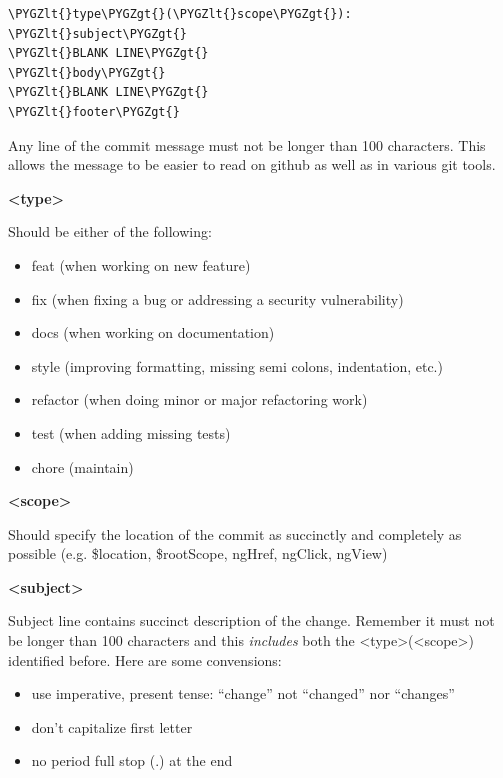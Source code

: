 \documentclass[letterpaper,10pt,english]{sphinxmanual}
\def\PYGZlt{\char`\<}
\def\PYGZgt{\char`\>}
\begin{document}
\begin{Verbatim}[commandchars=\\\{\}]
\PYGZlt{}type\PYGZgt{}(\PYGZlt{}scope\PYGZgt{}): \PYGZlt{}subject\PYGZgt{}
\PYGZlt{}BLANK LINE\PYGZgt{}
\PYGZlt{}body\PYGZgt{}
\PYGZlt{}BLANK LINE\PYGZgt{}
\PYGZlt{}footer\PYGZgt{}
\end{Verbatim}

Any line of the commit message must not be longer than 100
characters. This allows the message to be easier to read on github as
well as in various git tools.

\textbf{\textless{}type\textgreater{}}

Should be either of the following:
\begin{itemize}
\item {} 
feat (when working on new feature)

\item {} 
fix (when fixing a bug or addressing a security vulnerability)

\item {} 
docs (when working on documentation)

\item {} 
style (improving formatting, missing semi colons, indentation, etc.)

\item {} 
refactor (when doing minor or major refactoring work)

\item {} 
test (when adding missing tests)

\item {} 
chore (maintain)

\end{itemize}

\textbf{\textless{}scope\textgreater{}}

Should specify the location of the commit as succinctly and completely
as possible (e.g. \$location, \$rootScope, ngHref, ngClick, ngView)

\textbf{\textless{}subject\textgreater{}}

Subject line contains succinct description of the change. Remember it
must not be longer than 100 characters and this \emph{includes} both the
\textless{}type\textgreater{}(\textless{}scope\textgreater{}) identified before. Here are some convensions:
\begin{itemize}
\item {} 
use imperative, present tense: ``change'' not “changed” nor “changes”

\item {} 
don't capitalize first letter

\item {} 
no period full stop (.) at the end

\end{itemize}
\end{document}

